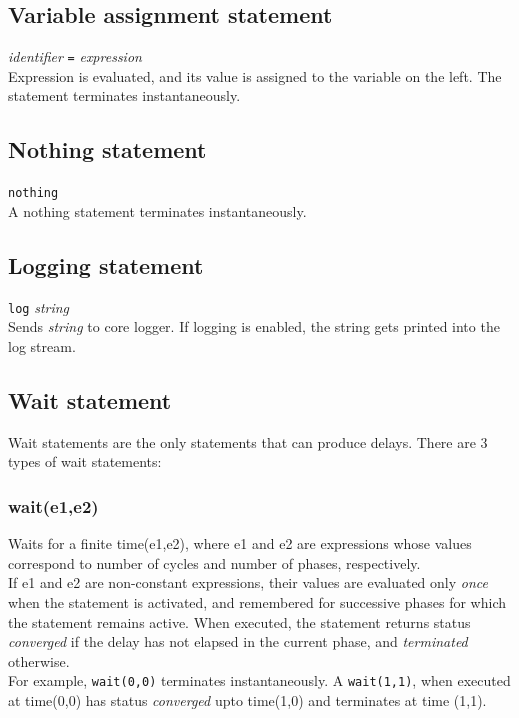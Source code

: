 \documentclass[12pt,a4paper]{report}
\begin{document}
	\subsection{Variable assignment statement}
		\textit{identifier} \texttt{=} \textit{expression}\\

	Expression is evaluated, and its value is assigned to the variable on the left.
	The statement terminates instantaneously.


	\subsection{Nothing statement}
		\texttt{nothing}\\

	A nothing statement terminates instantaneously.

	\subsection{Logging statement}
		\texttt{log} \textit{string}\\
	Sends \textit{string} to core logger. If logging is enabled,
	the string gets printed into the log stream.

	\subsection{Wait statement}
	Wait statements are the only statements that can produce delays.
	There are 3 types of wait statements:


	\subsubsection{wait(e1,e2)}

	Waits for a finite time(e1,e2), where e1 and e2 are expressions whose values correspond to 
	number of cycles and number of phases, respectively.\\


	If e1 and e2 are non-constant expressions, their values are evaluated only \emph{once} 
	when the statement is activated, and remembered for successive phases for which the 
	statement remains active. When executed, the statement returns status \emph{converged}
	if the delay has not elapsed in the current phase, and \emph{terminated} otherwise.\\


	For example, \texttt{wait(0,0)} terminates instantaneously. 
	A \texttt{wait(1,1)}, when executed at time(0,0) has status \emph{converged}
	upto time(1,0) and terminates at time (1,1).
\end{document}
